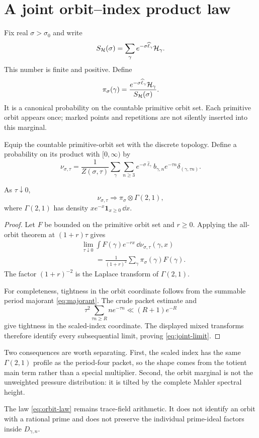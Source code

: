 \section{A joint orbit--index product law}

Fix real $\sigma>\sigma_0$ and write
\[
 S_{\mathcal H}(\sigma)
 =\sum_\gamma e^{-\sigma\widehat\ell_\gamma}\mathcal H_\gamma.
\]
This number is finite and positive.  Define
\begin{equation}
 \pi_\sigma(\gamma)
 =\frac{e^{-\sigma\widehat\ell_\gamma}\mathcal H_\gamma}
 {S_{\mathcal H}(\sigma)}.
 \label{eq:orbit-law}
\end{equation}
It is a canonical probability on the countable primitive orbit set.
Each primitive orbit appears once; marked points and repetitions are not
silently inserted into this marginal.

Equip the countable primitive-orbit set with the discrete topology.  Define
a probability on its product with $[0,\infty)$ by
\begin{equation}
 \nu_{\sigma,\tau}
 =\frac1{Z(\sigma,\tau)}
 \sum_\gamma\sum_{n\ge3}
 e^{-\sigma\widehat\ell_\gamma}b_{\gamma,n}e^{-\tau n}
 \delta_{(\gamma,\tau n)}.
 \label{eq:joint-measure}
\end{equation}

\begin{theorem}
As $\tau\downarrow0$,
\begin{equation}
 \nu_{\sigma,\tau}
 \Longrightarrow\pi_\sigma\otimes\Gamma(2,1),
 \label{eq:joint-limit}
\end{equation}
where $\Gamma(2,1)$ has density
$xe^{-x}\mathbf1_{x\ge0}\,\dd x$.
\end{theorem}

\begin{proof}
Let $F$ be bounded on the primitive orbit set and $r\ge0$.  Applying the
all-orbit theorem at $(1+r)\tau$ gives
\begin{align*}
 &\lim_{\tau\downarrow0}
 \int F(\gamma)e^{-rx}\,\dd\nu_{\sigma,\tau}(\gamma,x)\\
 &\qquad=\frac1{(1+r)^2}
 \sum_\gamma\pi_\sigma(\gamma)F(\gamma).
\end{align*}
The factor $(1+r)^{-2}$ is the Laplace transform of $\Gamma(2,1)$.

For completeness, tightness in the orbit coordinate follows from the
summable period majorant \eqref{eq:majorant}.  The crude packet estimate and
\[
 \tau^2\sum_{\tau n\ge R}ne^{-\tau n}\ll(R+1)e^{-R}
\]
give tightness in the scaled-index coordinate.  The displayed mixed
transforms therefore identify every subsequential limit, proving
\eqref{eq:joint-limit}.
\end{proof}

Two consequences are worth separating.  First, the scaled index has the same
$\Gamma(2,1)$ profile as the period-four packet, so the shape comes from the
totient main term rather than a special multiplier.  Second, the orbit
marginal is not the unweighted pressure distribution: it is tilted by the
complete Mahler spectral height.

The law \eqref{eq:orbit-law} remains trace-field arithmetic.  It does not
identify an orbit with a rational prime and does not preserve the individual
prime-ideal factors inside $D_{\gamma,n}$.
